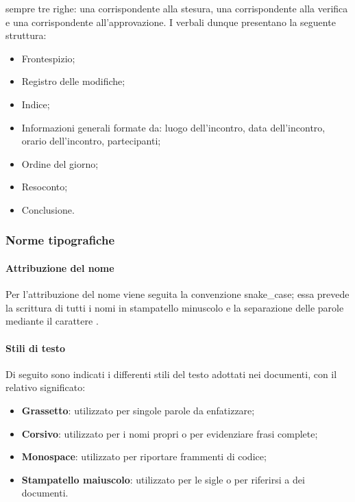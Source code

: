 sempre tre righe: una corrispondente alla stesura, una corrispondente alla verifica e una corrispondente 
all'approvazione. I verbali dunque presentano la seguente struttura:
\begin{itemize}
    \item Frontespizio;
    \item Registro delle modifiche;
    \item Indice;
    \item Informazioni generali formate da: luogo dell'incontro, data dell'incontro, orario dell'incontro, partecipanti;
    \item Ordine del giorno;
    \item Resoconto;
    \item Conclusione.
\end{itemize}

\subsubsection{Norme tipografiche}
\label{ssub:norme_tipografiche}

\paragraph{Attribuzione del nome}
\label{par:attribuzione_nome}

Per l'attribuzione del nome viene seguita la convenzione snake\_case; essa prevede la scrittura di tutti i nomi in 
stampatello minuscolo e la separazione delle parole mediante il carattere .

\paragraph{Stili di testo}
\label{par:stili_testo}

Di seguito sono indicati i differenti stili del testo adottati nei documenti, con il relativo significato:
\begin{itemize}
    \item \textbf{Grassetto}: utilizzato per singole parole da enfatizzare;
    \item \textbf{Corsivo}: utilizzato per i nomi propri o per evidenziare frasi complete;
    \item \textbf{Monospace}: utilizzato per riportare frammenti di codice;
    \item \textbf{Stampatello maiuscolo}: utilizzato per le sigle o per riferirsi a dei documenti.
\end{itemize}

